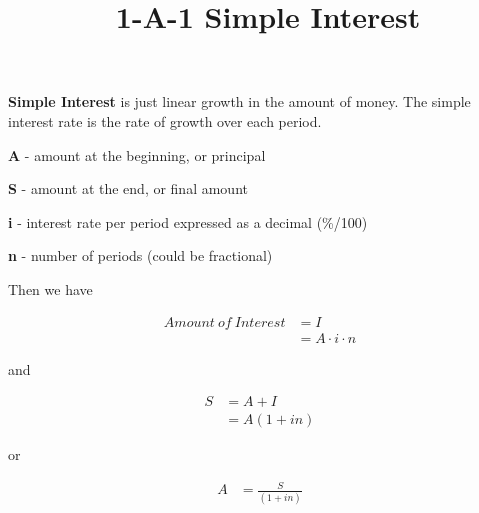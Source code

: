 \documentclass[12pt]{article}
\title{\normalfont\ 1-A-1 Simple Interest} %
\author{} %
\date{}  %
\begin{document}
\maketitle %

\vspace{-1in}

\begin{flushleft}
    \textbf{Simple Interest} is just linear growth in the amount of money.
    The simple interest rate is the rate of growth over each period.
\end{flushleft}

\begin{description}
    \item\textbf{A} - amount at the beginning, or principal
    \item\textbf{S} - amount at the end, or final amount
    \item\textbf{i} - interest rate per period expressed as a decimal {(\%/100)}
    \item\textbf{n} - number of periods (could be fractional)
\end{description}
\vspace{.5in}

\begin{flushleft}
    Then we have
\end{flushleft}
\vspace{-.5in}

\begin{align*}
    Amount \: of \: Interest & = I                 \\
                             & = A \cdot i \cdot n
\end{align*}

\begin{flushleft}
    and
\end{flushleft}
\vspace{-.5in}

\begin{align*}
    S & = A + I     \\
      & = A(1 + in)
\end{align*}

\begin{flushleft}
    or
\end{flushleft}
\vspace{-.5in}

\begin{align*}
    A & = \frac{S}{(1+in)}
\end{align*}
\vspace{.25in}
\end{document}
